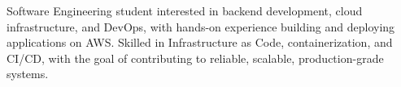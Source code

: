 
Software Engineering student interested in backend development, cloud infrastructure, and DevOps, with hands-on experience building and deploying applications on AWS. Skilled in Infrastructure as Code, containerization, and CI/CD, with the goal of contributing to reliable, scalable, production-grade systems.

